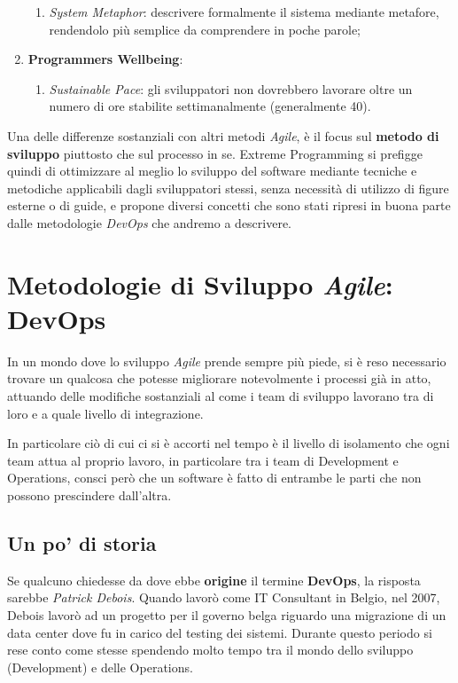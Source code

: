 \documentclass[../main.tex]{subfiles}
\begin{document}
\begin{enumerate}
\begin{enumerate}
        					\item \emph{System Metaphor}: descrivere formalmente il sistema mediante metafore, rendendolo più semplice da comprendere in poche parole;
        				\end{enumerate}
        			\item \textbf{Programmers Wellbeing}:
        				\begin{enumerate}
        					\item \emph{Sustainable Pace}: gli sviluppatori non dovrebbero lavorare oltre un numero di ore stabilite settimanalmente (generalmente 40).
        				\end{enumerate}
        		\end{enumerate}
        	
        	Una delle differenze sostanziali con altri metodi \emph{Agile}, è il focus sul \textbf{metodo di sviluppo} piuttosto che sul processo in se. Extreme Programming si prefigge quindi di ottimizzare al meglio lo sviluppo del software mediante tecniche e metodiche applicabili dagli sviluppatori stessi, senza necessità di utilizzo di figure esterne o di guide, e propone diversi concetti che sono stati ripresi in buona parte dalle metodologie \emph{DevOps} che andremo a descrivere.
        
        \section{Metodologie di Sviluppo \emph{Agile}: DevOps}
        
        	In un mondo dove lo sviluppo \emph{Agile} prende sempre più piede, si è reso necessario trovare un qualcosa che potesse migliorare notevolmente i processi già in atto, attuando delle modifiche sostanziali al come i team di sviluppo lavorano tra di loro e a quale livello di integrazione.
        	
        	In particolare ciò di cui ci si è accorti nel tempo è il livello di isolamento che ogni team attua al proprio lavoro, in particolare tra i team di Development e Operations, consci però che un software è fatto di entrambe le parti che non possono prescindere dall'altra.
        
        	\subsection{Un po' di storia}
        		
        		Se qualcuno chiedesse da dove ebbe \textbf{origine}\cite{devops_origin} il termine \textbf{DevOps}, la risposta sarebbe \emph{Patrick Debois}. Quando lavorò come IT Consultant in Belgio, nel 2007, Debois lavorò ad un progetto per il governo belga riguardo una migrazione di un data center dove fu in carico del testing dei sistemi. Durante questo periodo si rese conto come stesse spendendo molto tempo tra il mondo dello sviluppo (Development) e delle Operations.
        		
\end{document}
